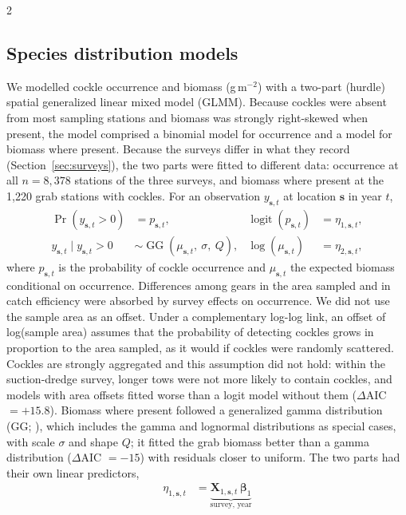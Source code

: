 \begin{spacing}{2}
\subsection{Species distribution models}
\label{sec:sdm}
We modelled cockle occurrence and biomass (g\,m$^{-2}$) with a two-part (hurdle) spatial generalized linear mixed model (GLMM). Because cockles were absent from most sampling stations and biomass was strongly right-skewed when present, the model comprised a binomial model for occurrence and a model for biomass where present. Because the surveys differ in what they record (Section~\ref{sec:surveys}), the two parts were fitted to different data: occurrence at all $n = 8{,}378$ stations of the three surveys, and biomass where present at the 1{,}220 grab stations with cockles. For an observation $y_{\mathbf{s},t}$ at location $\mathbf{s}$ in year $t$,
\begin{align}
\Pr(y_{\mathbf{s},t} > 0) &= p_{\mathbf{s},t}, &
\operatorname{logit}(p_{\mathbf{s},t}) &= \eta_{1,\mathbf{s},t},\\
y_{\mathbf{s},t} \mid y_{\mathbf{s},t} > 0 &\sim \operatorname{GG}\!\left(\mu_{\mathbf{s},t},\ \sigma,\ Q\right), &
\log(\mu_{\mathbf{s},t}) &= \eta_{2,\mathbf{s},t},
\end{align}
where $p_{\mathbf{s},t}$ is the probability of cockle occurrence and $\mu_{\mathbf{s},t}$ the expected biomass conditional on occurrence. Differences among gears in the area sampled and in catch efficiency were absorbed by survey effects on occurrence. We did not use the sample area as an offset. Under a complementary log-log link, an offset of log(sample area) assumes that the probability of detecting cockles grows in proportion to the area sampled, as it would if cockles were randomly scattered. Cockles are strongly aggregated and this assumption did not hold: within the suction-dredge survey, longer tows were not more likely to contain cockles, and models with area offsets fitted worse than a logit model without them ($\Delta$AIC $= +15.8$). Biomass where present followed a generalized gamma distribution (GG; \citet{prenticeLogGammaModel1974, dunicGeneralizedGammaFlexible2025}), which includes the gamma and lognormal distributions as special cases, with scale $\sigma$ and shape $Q$; it fitted the grab biomass better than a gamma distribution ($\Delta$AIC $=-15$) with residuals closer to uniform. The two parts had their own linear predictors,
\begin{align}
\eta_{1,\mathbf{s},t} &=
\underbrace{\mathbf{X}_{1,\mathbf{s},t}\,\boldsymbol{\beta}_1}_{\text{survey, year}}

\end{align}
\end{spacing}
